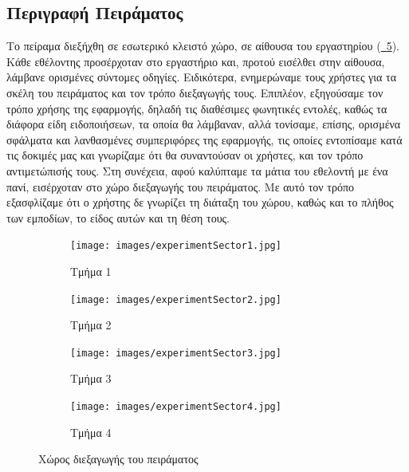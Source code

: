 \subsection{Περιγραφή Πειράματος}

Το πείραμα διεξήχθη σε εσωτερικό κλειστό χώρο, σε αίθουσα του εργαστηρίου (\hyperref[fig:experimentLab]{\schema~\ref*{fig:experimentLab}}). Κάθε εθέλοντης προσέρχοταν στο εργαστήριο και, προτού εισέλθει στην αίθουσα, λάμβανε ορισμένες σύντομες οδηγίες. Ειδικότερα, ενημερώναμε τους χρήστες για τα σκέλη του πειράματος και τον τρόπο διεξαγωγής τους. Επιπλέον, εξηγούσαμε τον τρόπο χρήσης της εφαρμογής, δηλαδή τις διαθέσιμες φωνητικές εντολές, καθώς τα διάφορα είδη ειδοποιήσεων, τα οποία θα λάμβαναν, αλλά τονίσαμε, επίσης, ορισμένα σφάλματα και λανθασμένες συμπεριφόρες της εφαρμογής, τις οποίες εντοπίσαμε κατά τις δοκιμές μας και γνωρίζαμε ότι θα συναντούσαν οι χρήστες, και τον τρόπο αντιμετώπισής τους. Στη συνέχεια, αφού καλύπταμε τα μάτια του εθελοντή με ένα πανί, εισέρχοταν στο χώρο διεξαγωγής του πειράματος. Με αυτό τον τρόπο εξασφλίζαμε ότι ο χρήστης δε γνωρίζει τη διάταξη του χώρου, καθώς και το πλήθος των εμποδίων, το είδος αυτών και τη θέση τους.

\begin{figure}[!h]
  \centering
  \begin{subfigure}{0.25\textwidth}
    \centering
    \texttt{[image: images/experimentSector1.jpg]}
    \caption{Τμήμα 1}\label{fig:experimentSector1}
  \end{subfigure}%
  \begin{subfigure}{0.25\textwidth}
    \centering
    \texttt{[image: images/experimentSector2.jpg]}
    \caption{Τμήμα 2}\label{fig:experimentSector2}
  \end{subfigure}%
  \begin{subfigure}{0.25\textwidth}
    \centering
    \texttt{[image: images/experimentSector3.jpg]}
    \caption{Τμήμα 3}\label{fig:experimentSector3}
  \end{subfigure}%
  \begin{subfigure}{0.25\textwidth}
    \centering
    \texttt{[image: images/experimentSector4.jpg]}
    \caption{Τμήμα 4}\label{fig:experimentSector4}
  \end{subfigure}%
  \caption{Χώρος διεξαγωγής του πειράματος}\label{fig:experimentLab}
\end{figure}

